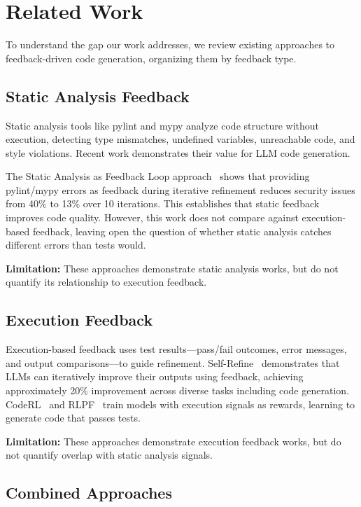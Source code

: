 \section{Related Work}
\label{sec:related}

To understand the gap our work addresses, we review existing approaches to feedback-driven code generation, organizing them by feedback type.

\subsection{Static Analysis Feedback}

Static analysis tools like pylint and mypy analyze code structure without execution, detecting type mismatches, undefined variables, unreachable code, and style violations. Recent work demonstrates their value for LLM code generation.

The Static Analysis as Feedback Loop approach~\cite{StaticFeedback2025} shows that providing pylint/mypy errors as feedback during iterative refinement reduces security issues from 40\% to 13\% over 10 iterations. This establishes that static feedback improves code quality. However, this work does not compare against execution-based feedback, leaving open the question of whether static analysis catches different errors than tests would.

\textbf{Limitation:} These approaches demonstrate static analysis works, but do not quantify its relationship to execution feedback.

\subsection{Execution Feedback}

Execution-based feedback uses test results---pass/fail outcomes, error messages, and output comparisons---to guide refinement. Self-Refine~\cite{Madaan2023SelfRefine} demonstrates that LLMs can iteratively improve their outputs using feedback, achieving approximately 20\% improvement across diverse tasks including code generation. CodeRL~\cite{CodeRL} and RLPF~\cite{RLPF2026} train models with execution signals as rewards, learning to generate code that passes tests.

\textbf{Limitation:} These approaches demonstrate execution feedback works, but do not quantify overlap with static analysis signals.

\subsection{Combined Approaches}

